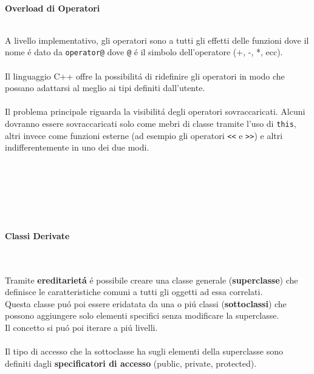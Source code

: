 \documentclass{article}
\begin{document}
\\ \\ \\ \\ \\ \\
\textcolor{grigio}{\begin{large}\textbf{Overload di Operatori}\\ \\ \end{large}
A livello implementativo, gli operatori sono a tutti gli effetti delle funzioni dove il nome \'e dato da \texttt{operator@} dove \texttt{@} \'e il simbolo dell'operatore (+, -, *, ecc).\\ \\Il linguaggio C++ offre la possibilit\'a di ridefinire gli operatori in modo che possano adattarsi al meglio ai tipi definiti dall'utente. \\ \\Il problema principale riguarda la visibilit\'a degli operatori sovraccaricati. Alcuni dovranno essere sovraccaricati solo come mebri di classe tramite l'uso di \texttt{this}, altri invece come funzioni esterne (ad esempio gli operatori \texttt{<<} e \texttt{>>}) e altri indifferentemente in uno dei due modi.} 
\\ \\ \\ \\ \\
\textcolor{grigio}{\begin{large}\textbf{Classi Derivate}\end{large}
\\ \\Tramite \textbf{ereditariet\'a} \'e possibile creare una classe generale (\textbf{superclasse}) che definisce le caratteristiche comuni a tutti gli oggetti ad essa correlati. \\Questa classe pu\'o poi essere eridatata da una o pi\'u classi (\textbf{sottoclassi}) che possono aggiungere solo elementi specifici senza modificare la superclasse. \\ Il concetto si pu\'o poi iterare a pi\'u livelli. \\ \\Il tipo di accesso che la sottoclasse ha sugli elementi della superclasse sono definiti dagli \textbf{specificatori di accesso} (public, private, protected).}
\\ \\ \\ \\ \\
\end{document}
